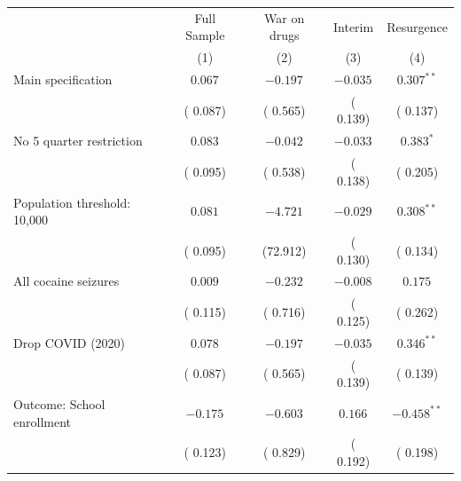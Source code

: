 \begin{tabular}{l c c c c}
\hline\hline
 & Full Sample & War on drugs & Interim & Resurgence  \\
 & (1) & (2) & (3) & (4) \\
\hline
Main specification
 & $ 0.067^{}$ & $-0.197^{}$ & $-0.035^{}$ & $ 0.307^{**}$ \\
 & ( 0.087) & ( 0.565) & ( 0.139) & ( 0.137) \\
No 5 quarter restriction
 & $ 0.083^{}$ & $-0.042^{}$ & $-0.033^{}$ & $ 0.383^{*}$ \\
 & ( 0.095) & ( 0.538) & ( 0.138) & ( 0.205) \\
Population threshold: 10,000
 & $ 0.081^{}$ & $-4.721^{}$ & $-0.029^{}$ & $ 0.308^{**}$ \\
 & ( 0.095) & (72.912) & ( 0.130) & ( 0.134) \\
All cocaine seizures
 & $ 0.009^{}$ & $-0.232^{}$ & $-0.008^{}$ & $ 0.175^{}$ \\
 & ( 0.115) & ( 0.716) & ( 0.125) & ( 0.262) \\
Drop COVID (2020)
 & $ 0.078^{}$ & $-0.197^{}$ & $-0.035^{}$ & $ 0.346^{**}$ \\
 & ( 0.087) & ( 0.565) & ( 0.139) & ( 0.139) \\
Outcome: School enrollment
 & $-0.175^{}$ & $-0.603^{}$ & $ 0.166^{}$ & $-0.458^{**}$ \\
 & ( 0.123) & ( 0.829) & ( 0.192) & ( 0.198) \\
\hline\hline
\end{tabular}
